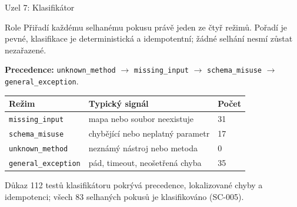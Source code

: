 \documentclass[aspectratio=169,11pt]{beamer}
\begin{document}
\begin{frame}[t]{Uzel 7: Klasifikátor}
  \footnotesize
  \begin{block}{Role}
    Přiřadí každému selhanému pokusu právě jeden ze čtyř režimů. Pořadí je
    pevné, klasifikace je deterministická a idempotentní; žádné selhání nesmí
    zůstat nezařazené.
  \end{block}

  \textbf{Precedence:} \texttt{unknown\_method} $\rightarrow$
  \texttt{missing\_input} $\rightarrow$ \texttt{schema\_misuse} $\rightarrow$
  \texttt{general\_exception}.

  \begin{table}
    \centering
    \begin{tabular}{@{}p{3.1cm}p{7.0cm}p{1.5cm}@{}}
      \toprule
      \textbf{Režim} & \textbf{Typický signál} & \textbf{Počet} \\
      \midrule
      \texttt{missing\_input} & mapa nebo soubor neexistuje & 31 \\
      \texttt{schema\_misuse} & chybějící nebo neplatný parametr & 17 \\
      \texttt{unknown\_method} & neznámý nástroj nebo metoda & 0 \\
      \texttt{general\_exception} & pád, timeout, neošetřená chyba & 35 \\
      \bottomrule
    \end{tabular}
  \end{table}

  \begin{alertblock}{Důkaz}
    112 testů klasifikátoru pokrývá precedence, lokalizované chyby a
    idempotenci; všech 83 selhaných pokusů je klasifikováno (SC-005).
  \end{alertblock}
\end{frame}
\end{document}
